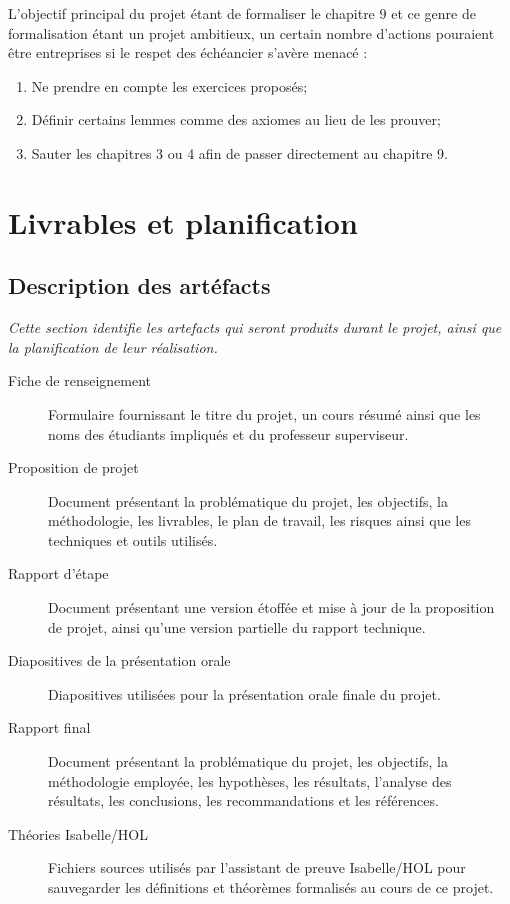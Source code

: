 \documentclass[a4paper, oneside, 12pt, titlepage, draft]{article}
\begin{document}
L'objectif principal du projet étant de formaliser le chapitre 9 et ce genre de formalisation étant
un projet ambitieux, un certain nombre d'actions pouraient être entreprises si le respet des
échéancier s'avère menacé :

\begin{enumerate}
  \label{lower-objectives}
  \item Ne prendre en compte les exercices proposés;
  \item Définir certains lemmes comme des axiomes au lieu de les prouver;
  \item Sauter les chapitres 3 ou 4 afin de passer directement au chapitre 9.
\end{enumerate}

\section{Livrables et planification}

\subsection{Description des artéfacts}

\emph{Cette section identifie les artefacts qui seront produits durant le projet, ainsi que la
planification de leur réalisation.}

\begin{description}
  \item[Fiche de renseignement]
    Formulaire fournissant le titre du projet, un cours résumé ainsi que les noms des étudiants
    impliqués et du professeur superviseur.
  \item[Proposition de projet]
    Document présentant la problématique du projet, les objectifs, la méthodologie, les livrables,
    le plan de travail, les risques ainsi que les techniques et outils utilisés.
  \item[Rapport d'étape]
    Document présentant une version étoffée et mise à jour de la proposition de projet, ainsi qu'une
    version partielle du rapport technique.
  \item[Diapositives de la présentation orale]
    Diapositives utilisées pour la présentation orale finale du projet.
  \item[Rapport final]
    Document présentant la problématique du projet, les objectifs, la méthodologie employée, les
    hypothèses, les résultats, l'analyse des résultats, les conclusions, les recommandations et les
    références.
  \item[Théories Isabelle/HOL]
    Fichiers sources utilisés par l'assistant de preuve Isabelle/HOL pour sauvegarder les
    définitions et théorèmes formalisés au cours de ce projet.
\end{description}
\end{document}
